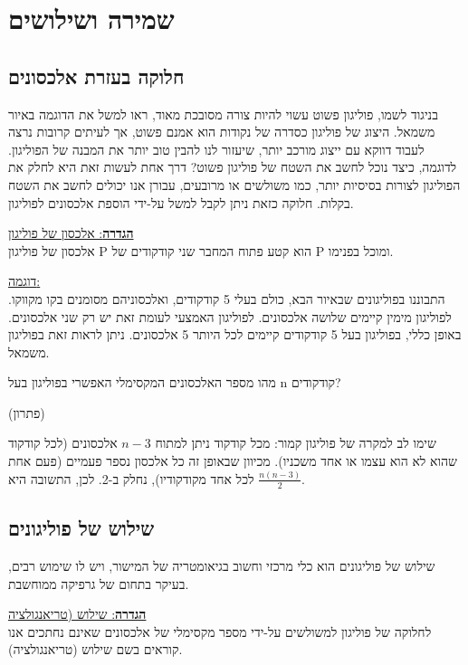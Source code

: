 \documentclass[
]{book}
\begin{document}
\hypertarget{guarding}{%
\section{שמירה ושילושים}\label{guarding}}

\hypertarget{diagonals}{%
\subsection{חלוקה בעזרת אלכסונים}\label{diagonals}}

בניגוד לשמו, פוליגון פשוט עשוי להיות צורה מסובכת מאוד, ראו למשל את הדוגמה באיור משמאל. היצוג של פוליגון כסדרה של נקודות הוא אמנם פשוט, אך לעיתים קרובות נרצה לעבוד דווקא עם ייצוג מורכב יותר, שיעזור לנו להבין טוב יותר את המבנה של הפוליגון. לדוגמה, כיצד נוכל לחשב את השטח של פוליגון פשוט? דרך אחת לעשות זאת היא לחלק את הפוליגון לצורות בסיסיות יותר, כמו משולשים או מרובעים, עבורן אנו יכולים לחשב את השטח בקלות. חלוקה כזאת ניתן לקבל למשל על-ידי הוספת אלכסונים לפוליגון.

\ul{\textbf{הגדרה}: אלכסון של פוליגון}\\
אלכסון של פוליגון P הוא קטע פתוח המחבר שני קודקודים של P ומוכל בפנימו.

\ul{דוגמה:\\
}התבוננו בפוליגונים שבאיור הבא, כולם בעלי 5 קודקודים, ואלכסוניהם מסומנים בקו מקווקו. לפוליגון מימין קיימים שלושה אלכסונים. לפוליגון האמצעי לעומת זאת יש רק שני אלכסונים. באופן כללי, בפוליגון בעל 5 קודקודים קיימים לכל היותר 5 אלכסונים. ניתן לראות זאת בפוליגון משמאל.

מהו מספר האלכסונים המקסימלי האפשרי בפוליגון בעל n קודקודים?

(פתרון)

שימו לב למקרה של פוליגון קמור: מכל קודקוד ניתן למתוח \(n-3\) אלכסונים (לכל קודקוד שהוא לא הוא עצמו או אחד משכניו). מכיוון שבאופן זה כל אלכסון נספר פעמיים (פעם אחת לכל אחד מקודקודיו), נחלק ב-2. לכן, התשובה היא \(\frac{n(n-3)}{2}\).

\hypertarget{triangulation}{%
\subsection{שילוש של פוליגונים}\label{triangulation}}

שילוש של פוליגונים הוא כלי מרכזי וחשוב בגיאומטריה של המישור, ויש לו שימוש רבים, בעיקר בתחום של גרפיקה ממוחשבת.

\ul{\textbf{הגדרה}: שילוש (טריאנגולציה}\\
לחלוקה של פוליגון למשולשים על-ידי מספר מקסימלי של אלכסונים שאינם נחתכים אנו קוראים בשם שילוש (טריאנגולציה).
\end{document}
